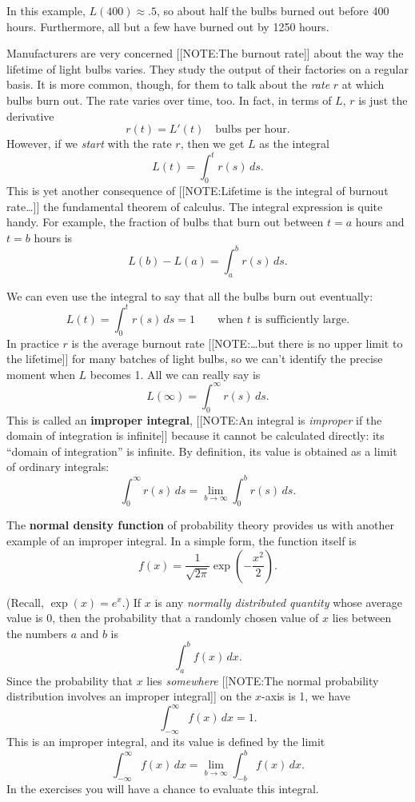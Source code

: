 In this example, $L(400) \approx .5$, so about half the bulbs burned out before 400 hours.  Furthermore, all but a few have burned out by 1250 hours.  

Manufacturers are very concerned 
[[NOTE:The burnout rate]]	
about the way the lifetime of light bulbs varies.  They study the
output of their factories on a regular basis.  It is more common,
though, for them to talk about the {\em rate\/} $r$ at which bulbs
burn out.  The rate varies over time, too.  In fact, in terms of $L$,
$r$ is just the derivative
	\[
r(t) = L'(t) \quad \mbox{bulbs per hour.}
\]
However, if we {\em start\/} with the rate $r$, then we get $L$ as the integral
	\[
L(t) = \int_0^t r(s) \, ds.
\]
This is yet another consequence of 
[[NOTE:Lifetime is the integral of burnout rate\ldots]]
the fundamental theorem of calculus.  The integral expression is quite handy.  For example,
the fraction of bulbs that burn out between $t= a$ hours and $t = b$
hours is
	\[
L(b) - L(a) = \int_a^b r(s) \, ds.
\]

We can even use the integral to say that all the bulbs burn out eventually:
	\[
L(t) = \int_0^t r(s) \, ds = 1 \qquad 
		\mbox{when $t$ is sufficiently large.}
\]
In practice $r$ is the average burnout rate 
[[NOTE:\ldots but there is no upper limit to the lifetime]]
for many batches of light bulbs, so we can't identify the precise
moment when $L$ becomes 1.  All we can really say is
\[
	L(\infty) = \int_0^{\infty} r(s) \, ds.
\]
This is called an {\bf improper integral}, 
[[NOTE:An integral is {\em improper\/} if the domain of integration is
  infinite]]
because it cannot be calculated directly: its ``domain of
integration'' is infinite.  By definition, its value is obtained as a
limit of ordinary integrals:
	\[
\int_0^{\infty} r(s) \, ds = 
		\lim_{b \to \infty} \int_0^b r(s) \, ds.
\]

The \label{`normal'} {\bf normal density function} of probability theory provides us with another
example of an improper integral.  In a simple form, the function
itself is
\[
f(x) = \dfrac{1}{\sqrt{2\pi}} \exp\left(-\dfrac{x^2}{2}\right).
\]

(Recall, $\exp(x) = e^x$.)  If $x$ is any {\em normally distributed
  quantity\/} whose average value is 0, then the probability that a
randomly chosen value of $x$ lies between the numbers $a$ and $b$ is
	\[
\int_a^b f(x) \, dx.
\]
Since the probability that $x$ lies {\em somewhere\/} 
[[NOTE:The normal probability distribution involves  an improper integral]]
on the $x$-axis is 1, we have
	\[
\int_{-\infty}^{\infty} f(x) \, dx = 1.
\]
This is an improper integral, and its value
is defined by the limit
	\[
\int_{-\infty}^{\infty} f(x) \, dx = 
		\lim_{b \to \infty} \int_{-b}^b f(x) \, dx.
\]
In the exercises you will have a chance to evaluate this integral.


